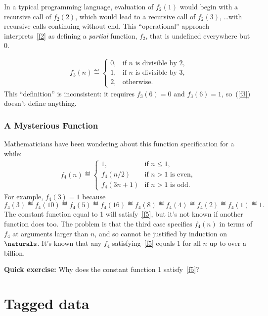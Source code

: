 \begin{definition}
In a typical programming language, evaluation of $f_2(1)$ would begin with
a recursive call of $f_2(2)$, which would lead to a recursive call of
$f_2(3)$, \dots with recursive calls continuing without end.  This
``operational'' approach interprets~\eqref{f2} as defining a
\emph{partial} function, $f_2$, that is undefined everywhere but 0.

\begin{eqnarray}\label{f3}
f_3(n) \eqdef \begin{cases}
  0, &  \text{if $n$ is divisible by 2,}\\
  1, &  \text{if $n$ is divisible by 3,}\\
  2, & \text{otherwise.}
 \end{cases}
\end{eqnarray}
This ``definition'' is inconsistent: it requires $f_3(6) = 0$ and $f_3(6)
=1$, so~(\ref{f3}) doesn't define anything.

\subsubsection{A Mysterious Function}
Mathematicians have been wondering about this function specification for a
while:
\begin{eqnarray}\label{f5}
f_4(n) \eqdef\begin{cases}
 1, & \text{if $n\le 1$},\\
 f_4(n/2) &  \text{if $n>1$ is even},\\
 f_4(3n+1)& \text{if $n>1$ is odd}.
\end{cases}
\end{eqnarray}
For example, $f_4(3)=1$ because
\[
f_4(3)\eqdef f_4(10)\eqdef f_4(5)\eqdef f_4(16)\eqdef f_4(8)\eqdef
f_4(4)\eqdef f_4(2)\eqdef f_4(1)\eqdef 1.
\]
The constant function equal to 1 will satisfy~\eqref{f5}, but it's not
known if another function does too.  The problem is that the third case
specifies $f_4(n)$ in terms of $f_4$ at arguments larger than $n$, and so
cannot be justified by induction on $\naturals$.  It's known that any
$f_4$ satisfying~\eqref{f5} equals 1 for all $n$ up to over a billion.

\textbf{Quick exercise:} Why does the constant function 1
satisfy~\eqref{f5}?

\iffalse

\section{Tagged data}


\end{definition}
